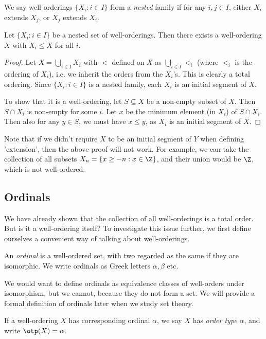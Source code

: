\documentclass[a4paper]{article}
\begin{document}
\begin{defi}
  We say well-orderings $\{X_i: i\in I\}$ form a \emph{nested} family if for any $i, j\in I$, either $X_i$ extends $X_j$, or $X_j$ extends $X_i$.
\end{defi}

\begin{prop}
  Let $\{X_i: i\in I\}$ be a nested set of well-orderings. Then there exists a well-ordering $X$ with $X_i\leq X$ for all $i$.
\end{prop}

\begin{proof}
  Let $X = \bigcup_{i\in I}X_i$ with $<$ defined on $X$ as $\bigcup_{i\in I} <_i$ (where $<_i$ is the ordering of $X_i$), i.e. we inherit the orders from the $X_i$'s. This is clearly a total ordering. Since $\{X_i: i \in I\}$ is a nested family, each $X_i$ is an initial segment of $X$.

  To show that it is a well-ordering, let $S\subseteq X$ be a non-empty subset of $X$. Then $S\cap X_i$ is non-empty for some $i$. Let $x$ be the minimum element (in $X_i$) of $S\cap X_i$. Then also for any $y\in S$, we must have $x \leq y$, as  $X_i$ is an initial segment of $X$.
\end{proof}
Note that if we didn't require $X$ to be an initial segment of $Y$ when defining 'extension', then the above proof will not work. For example, we can take the collection of all subsets $X_n = \{x \geq -n: x\in \Z\}$, and their union would be $\Z$, which is not well-ordered.

\subsection{Ordinals}
We have already shown that the collection of all well-orderings is a total order. But is it a well-ordering itself? To investigate this issue further, we first define ourselves a convenient way of talking about well-orderings.

\begin{defi}[Ordinal]
  An \emph{ordinal} is a well-ordered set, with two regarded as the same if they are isomorphic. We write ordinals as Greek letters $\alpha, \beta$ etc.
\end{defi}
We would want to define ordinals as equivalence classes of well-orders under isomorphism, but we cannot, because they do not form a set. We will provide a formal definition of ordinals later when we study set theory.

\begin{defi}
  If a well-ordering $X$ has corresponding ordinal $\alpha$, we say $X$ has \emph{order type} $\alpha$, and write $\otp(X) = \alpha$.
\end{defi}
\end{document}
